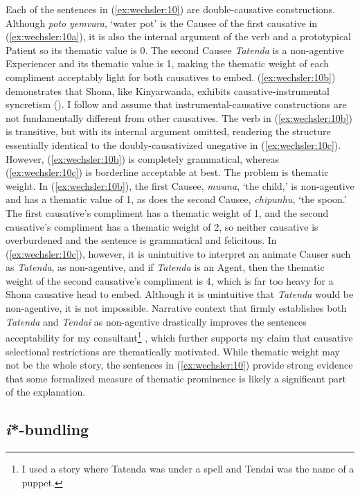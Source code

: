 \documentclass[output=paper,modfonts,nonflat,colorlinks,citecolor=brown]{langsci/langscibook}
\begin{document}
Each of the sentences in (\ref{ex:wechsler:10}) are double-causative constructions. Although \textit{poto} \textit{yemvura}, ‘water pot’ is the Causee of the first causative in (\ref{ex:wechsler:10a}), it is also the internal argument of the verb and a prototypical Patient so its thematic value is 0. The second Causee \textit{Tatenda} is a non-agentive Experiencer and its thematic value is 1, making the thematic weight of each compliment acceptably light for both causatives to embed. (\ref{ex:wechsler:10b}) demonstrates that Shona, like Kinyarwanda, exhibits causative-instrumental syncretism (\citealt{Kimenyi1980,Kimenyi1995,Peterson2007,Jerro2013}). I follow \citet{Jerro2013} and assume that instrumental-causative constructions are not fundamentally different from other causatives. The verb in (\ref{ex:wechsler:10b}) is transitive, but with its internal argument omitted, rendering the structure essentially identical to the doubly-causativized unegative in (\ref{ex:wechsler:10c}). However, (\ref{ex:wechsler:10b}) is completely grammatical, whereas (\ref{ex:wechsler:10c}) is borderline acceptable at best. The problem is thematic weight. In (\ref{ex:wechsler:10b}), the first Causee, \textit{mwana}, ‘the child,’ is non-agentive and has a thematic value of 1, as does the second Causee, \textit{chipunhu}, ‘the spoon.’ The first causative’s compliment has a thematic weight of 1, and the second causative’s compliment has a thematic weight of 2, so neither causative is overburdened and the sentence is grammatical and felicitous. In (\ref{ex:wechsler:10c}), however, it is unintuitive to interpret an animate Causer such as \textit{Tatenda}, as non-agentive, and if \textit{Tatenda} is an Agent, then the thematic weight of the second causative’s compliment is 4, which is far too heavy for a Shona causative head to embed. Although it is unintuitive that \textit{Tatenda} would be non-agentive, it is not impossible. Narrative context that firmly establishes both \textit{Tatenda} and \textit{Tendai} as non-agentive drastically improves the sentences acceptability for my consultant\footnote{I used a story where Tatenda was under a spell and Tendai was the name of a puppet.} , which further supports my claim that causative selectional restrictions are thematically motivated. While thematic weight may not be the whole story, the sentences in (\ref{ex:wechsler:10}) provide strong evidence that some formalized measure of thematic prominence is likely a significant part of the explanation.\\

\subsection{\textit{i}*-bundling}\label{sec:wechsler:2.4}
\end{document}
